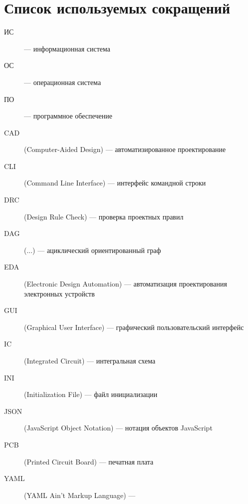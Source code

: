 \chapter*{Список используемых сокращений}

\begin{description}
	\item[ИС] --- информационная система
	\item[ОС] --- операционная система
	\item[ПО] --- программное обеспечение
	\item[CAD] (Computer-Aided Design) --- автоматизированное проектирование
	\item[CLI] (Command Line Interface) --- интерфейс командной строки
	\item[DRC] (Design Rule Check) --- проверка проектных правил
	\item[DAG] (...) --- ациклический ориентированный граф
	\item[EDA] (Electronic Design Automation)
		--- автоматизация проектирования электронных устройств
	\item[GUI] (Graphical User Interface)
		--- графический пользовательский интерфейс
	\item[IC] (Integrated Circuit) --- интегральная схема
	\item[INI] (Initialization File) --- файл инициализации
	\item[JSON] (JavaScript Object Notation) --- нотация объектов JavaScript
	\item[PCB] (Printed Circuit Board) --- печатная плата
	\item[YAML] (YAML Ain't Markup Language) --- 
\end{description}

